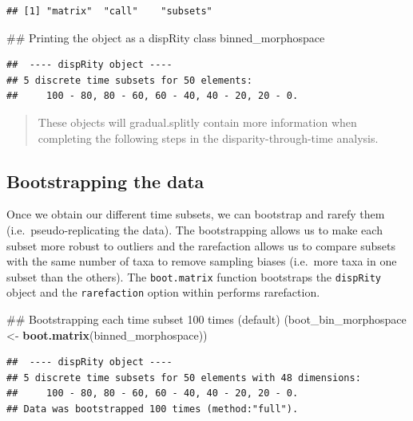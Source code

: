 \documentclass[]{book}
\newenvironment{Shaded}{\begin{snugshade}}{\end{snugshade}}
\newcommand{\KeywordTok}[1]{\textcolor[rgb]{0.13,0.29,0.53}{\textbf{#1}}}
\newcommand{\StringTok}[1]{\textcolor[rgb]{0.31,0.60,0.02}{#1}}
\newcommand{\NormalTok}[1]{#1}
\theoremstyle{definition}
\theoremstyle{definition}
\theoremstyle{remark}
\begin{document}
\begin{verbatim}
## [1] "matrix"  "call"    "subsets"
\end{verbatim}

\begin{Shaded}
\begin{Highlighting}[]
\NormalTok{## Printing the object as a dispRity class}
\NormalTok{binned_morphospace}
\end{Highlighting}
\end{Shaded}

\begin{verbatim}
##  ---- dispRity object ---- 
## 5 discrete time subsets for 50 elements:
##     100 - 80, 80 - 60, 60 - 40, 40 - 20, 20 - 0.
\end{verbatim}

\begin{quote}
These objects will gradual.splitly contain more information when
completing the following steps in the disparity-through-time analysis.
\end{quote}

\subsection{Bootstrapping the data}\label{bootstrapping-the-data}

Once we obtain our different time subsets, we can bootstrap and rarefy
them (i.e.~pseudo-replicating the data). The bootstrapping allows us to
make each subset more robust to outliers and the rarefaction allows us
to compare subsets with the same number of taxa to remove sampling
biases (i.e.~more taxa in one subset than the others). The
\texttt{boot.matrix} function bootstraps the \texttt{dispRity} object
and the \texttt{rarefaction} option within performs rarefaction.

\begin{Shaded}
\begin{Highlighting}[]
\NormalTok{## Bootstrapping each time subset 100 times (default)}
\NormalTok{(boot_bin_morphospace <-}\StringTok{ }\KeywordTok{boot.matrix}\NormalTok{(binned_morphospace))}
\end{Highlighting}
\end{Shaded}

\begin{verbatim}
##  ---- dispRity object ---- 
## 5 discrete time subsets for 50 elements with 48 dimensions:
##     100 - 80, 80 - 60, 60 - 40, 40 - 20, 20 - 0.
## Data was bootstrapped 100 times (method:"full").
\end{verbatim}
\end{document}
